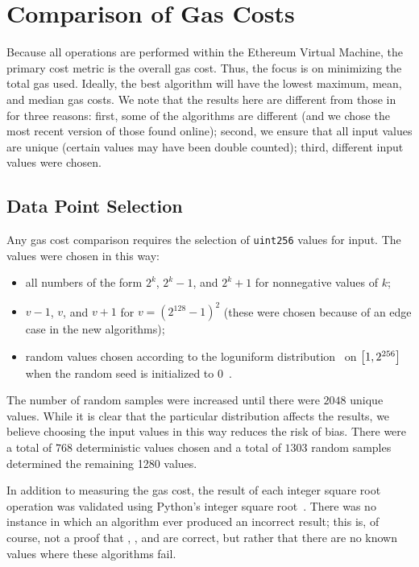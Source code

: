 \section{Comparison of Gas Costs}
\label{sec:comparison}

Because all operations are performed within the Ethereum Virtual Machine,
the primary cost metric is the overall gas cost.
Thus, the focus is on minimizing the total gas used.
Ideally, the best algorithm will have the lowest maximum, mean, and median
gas costs.
We note that the results here are different from those
in~\cite{EfficientIsqrt} for three reasons:
first, some of the algorithms are different
(and we chose the most recent version of those found online);
second, we ensure that all input values are unique
(certain values may have been double counted);
third, different input values were chosen.

\subsection{Data Point Selection}

Any gas cost comparison requires the selection of \texttt{uint256}
values for input.
The values were chosen in this way:

\begin{itemize}
\item all numbers of the form $2^{k}$, $2^{k}-1$, and $2^{k}+1$
    for nonnegative values of $k$;
\item $v-1$, $v$, and $v+1$ for $v = (2^{128}-1)^{2}$
    (these were chosen because of an edge case in the new algorithms);
\item random values chosen according to the
    loguniform distribution~\cite{ScipyLoguniform}
    on $\left[ 1, 2^{256} \right]$ when the random seed
    is initialized to $0$~\cite{NumpyRandomSeed}.
\end{itemize}

\noindent
The number of random samples were increased until
there were $2048$ unique values.
While it is clear that the particular distribution affects the results,
we believe choosing the input values in this way reduces
the risk of bias.
There were a total of $768$ deterministic values chosen
and a total of $1303$ random samples determined
the remaining 1280 values.

In addition to measuring the gas cost,
the result of each integer square root operation was
validated using
Python's integer square root~\cite{PythonIsqrt,PythonIsqrtLink}.
There was no instance in which an algorithm ever produced an incorrect result;
this is, of course, not a proof that 
\prb{}, \OpenZeppelin{}, and \abdk{} are correct,
but rather that there are no known values where these algorithms fail.

